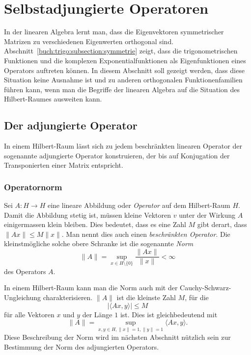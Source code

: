 %
%
%
\section{Selbstadjungierte Operatoren
\label{buch:orthofkt:section:sa}}
In der linearen Algebra lernt man, dass die Eigenvektoren
symmetrischer Matrizen zu verschiedenen Eigenwerten orthogonal
sind.
Abschnitt~\ref{buch:trigo:subsection:symmetrie}
zeigt, dass die trigonometrischen Funktionen und die
komplexen Exponentialfunktionen als Eigenfunktionen eines
Operators auftreten können.
In diesem Abschnitt soll gezeigt werden, dass diese Situation
keine Ausnahme ist und zu anderen orthogonalen Funktionenfamilien
führen kann, wenn man die Begriffe der linearen Algebra auf
die Situation des Hilbert-Raumes ausweiten kann.

%
%
\subsection{Der adjungierte Operator}
In einem Hilbert-Raum lässt sich zu jedem beschränkten linearen
Operator der sogenannte adjungierte Operator konstruieren, der
bis auf Konjugation der Transponierten einer Matrix entspricht.

%
%
\subsubsection{Operatornorm}
Sei $A:H\to H$ eine lineare Abbildung oder {\em Operator} auf dem
Hilbert-Raum $H$.
Damit die Abbildung stetig ist, müssen kleine Vektoren $v$ unter der
Wirkung $A$ einigermassen klein bleiben.
Dies bedeutet, dass es eine Zahl $M$ gibt derart, dass $\|Ax\| \le M\|x\|$.
Man nennt dies auch einen {\em beschränkten Operator}.
%
Die kleinstmögliche solche obere Schranke ist
die sogenannte {\em Norm}
%
\[
\|A\|
=
\sup_{x\in H\setminus\{0\}} \frac{\|Ax\|}{\|x\|}
<
\infty
\]
des Operators $A$.

In einem Hilbert-Raum kann man die Norm auch mit der Cauchy-Schwarz-Ungleichung
charakterisieren.
$\|A\|$ ist die kleinste Zahl $M$, für die 
\begin{equation}
|\langle Ax,y\rangle| \le M
\label{buch:orthofkt:sa:eqn:normcauchyschwarz}
\end{equation}
für alle Vektoren $x$ und $y$ der Länge $1$ ist.
Dies ist gleichbedeutend mit
\begin{equation}
\|A\|
=
\sup_{x,y\in H, \|x\|=1, \|y\|=1}
\langle Ax,y\rangle.
\label{buch:orthofkt:sa:eqn:normcauchyschwarzsup}
\end{equation}
Diese Beschreibung der Norm wird im nächsten Abschnitt nützlich sein zur
Bestimmung der Norm des adjungierten Operators.

